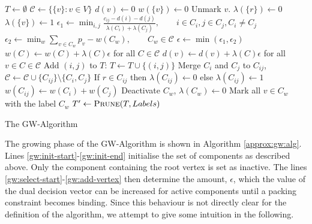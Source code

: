  
 \begin{algorithm}[h!]
   \begin{algorithmic}[1]
     \State $T \gets \emptyset$ \label{gw:init-start}
     \State $\mathcal{C} \gets \{\{v\} : v \in V\}$
       \State $d(v) \gets 0$
       \State $w(\{v\}) \gets 0$
       \State Unmark $v$.
         \State $\lambda(\{r\}) \gets 0$
       \Else
         \State $\lambda(\{v\}) \gets 1$
       \EndIf
     \EndFor \label{gw:init-end}
     \State $\epsilon_1 \gets \min_{i,j} \frac{c_{ij} - d(i) - d(j)}{\lambda (C_i) + \lambda(C_j)},
     \qquad i \in C_i, j \in C_j, C_i \neq C_j$ \label{gw:select-start}
     \State $\epsilon_2 \gets \min_{w} \sum_{v \in C_w} p_v - w(C_w), \qquad C_w \in \mathcal{C}$
     \State $\epsilon \gets \min(\epsilon_1, \epsilon_2)$ 
     \State $w(C) \gets w(C) + \lambda(C) \epsilon$ for all $C \in \mathcal{C}$ \label{gw:add-component}
     \State $d(v) \gets d(v) + \lambda(C) \epsilon$ for all $v \in C \in \mathcal{C}$ \label{gw:add-vertex}
     \State Add $(i,j)$ to $T$: $T \gets T \cup \{(i,j)\}$
     \State Merge $C_i$ and $C_j$ to $C_{ij}$,
     $\mathcal{C} \gets \mathcal{C} \cup \{C_{ij}\} \setminus \{C_i, C_j\}$
     \State If $r \in C_{ij}$ then $\lambda(C_{ij}) \gets 0$ else $\lambda(C_{ij}) \gets 1$
     \State $w(C_{ij}) \gets w(C_i) + w(C_j)$
     \Else
     \State Deactivate $C_w$, $\lambda(C_w) \gets 0$
     \State Mark all $v \in C_w$ with the label $C_w$
     \EndIf
     \EndWhile
     \State $T' \gets \Call{Prune}{T, Labels}$ 
   \EndProcedure
 \end{algorithmic}
 \caption{The GW-Algorithm}\label{approx:gw:alg}
 \end{algorithm}

 The growing phase of the GW-Algorithm is shown in Algorithm \ref{approx:gw:alg}. Lines \ref{gw:init-start}-\ref{gw:init-end}
 initialise the set of components as described above. Only the component containing the root vertex is set as inactive.
 The lines \ref{gw:select-start}-\ref{gw:add-vertex} then determine the amount, $\epsilon$, which the value of the dual decision vector
 can be increased for active components
 until a packing constraint becomes binding. Since this behaviour is not directly clear for the definition of the algorithm,
  we attempt to give some intuition in the following.

